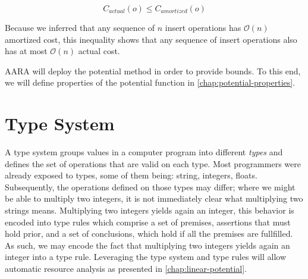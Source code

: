\[C_{actual}(o) \leq C_{amortized}(o)\]
\label{ineq:actual-amortized}

Because we inferred that any sequence of \(n\) insert operations has \(\mathcal{O}(n)\) amortized cost, this inequality shows that any sequence of insert operations also has at most \(\mathcal{O}(n)\) actual cost.

AARA will deploy the potential method in order to provide bounds. To this end, we will define properties of the potential function in \ref{chap:potential-properties}.

\section{Type System}

A type system groups values in a computer program into different \emph{types} and defines the set of operations that are valid on each type. Most programmers were already exposed to types, some of them being: string, integers, floats. Subsequently, the operations defined on those types may differ; where we might be able to multiply two integers, it is not immediately clear what multiplying two strings means.
Multiplying two integers yields again an integer, this behavior is encoded into type rules which comprise a set of premises, assertions that must hold prior, and a set of conclusions, which hold if all the premises are fullfilled. As such, we may encode the fact that multiplying two integers yields again an integer into a type rule.
Leveraging the type system and type rules will allow automatic resource analysis as presented in \ref{chap:linear-potential}.




